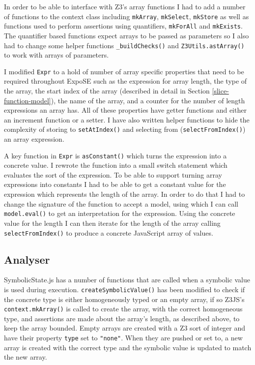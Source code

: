 \documentclass[]{final_report}
\begin{document}
In order to be able to interface with Z3’s array functions I had to add a number of functions to the context class including \lstinline|mkArray|, \lstinline|mkSelect|, \lstinline|mkStore| as well as functions used to perform assertions using quantifiers, \lstinline|mkForAll| and \lstinline|mkExists|. The quantifier based functions expect arrays to be passed as parameters so I also had to change some helper functions \lstinline|_buildChecks()| and \lstinline|Z3Utils.astArray()| to work with arrays of parameters.

I modified \lstinline|Expr| to a hold of number of array specific properties that need to be required throughout ExpoSE such as the expression for array length, the type of the array, the start index of the array (described in detail in Section \ref{slice-function-model}), the name of the array, and a counter for the number of length expressions an array has. All of these properties have getter functions and either an increment function or a setter. I have also written helper functions to hide the complexity of storing to \lstinline|setAtIndex()| and selecting from (\lstinline|selectFromIndex()|) an array expression.

A key function in \lstinline|Expr| is \lstinline|asConstant()| which turns the expression into a concrete value. I rewrote the function into a small switch statement which evaluates the sort of the expression. To be able to support turning array expressions into constants I had to be able to get a constant value for the expression which represents the length of the array. In order to do that I had to change the signature of the function to accept a model, using which I can call \lstinline|model.eval()| to get an interpretation for the expression. Using the concrete value for the length I can then iterate for the length of the array calling \lstinline|selectFromIndex()| to produce a concrete JavaScript array of values.

\subsection{Analyser}
SymbolicState.js has a number of functions that are called when a symbolic value is used during execution. \lstinline|createSymbolicValue()| has been modified to check if the concrete type is either homogeneously typed or an empty array, if so Z3JS’s \lstinline|context.mkArray()| is called to create the array, with the correct homogeneous type, and assertions are made about the array’s length, as described above, to keep the array bounded. Empty arrays are created with a Z3 sort of integer and have their property \lstinline|type| set to \lstinline|"none"|. When they are pushed or set to, a new array is created with the correct type and the symbolic value is updated to match the new array.
\end{document}

